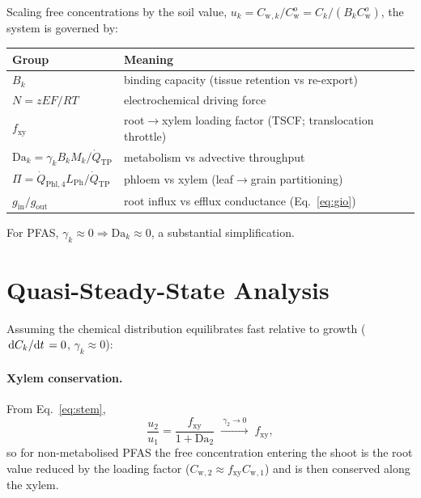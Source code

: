 \documentclass[12pt,a4paper]{article}
\newcommand{\Cw}{C_{\mathrm{w}}}
\begin{document}
Scaling free concentrations by the soil value, $u_k=\Cw{}_{,k}/\Cw^{o}=C_k/(B_k\Cw^{o})$, the system is governed by:
\begin{center}
\renewcommand{\arraystretch}{1.3}
\begin{tabular}{@{}ll@{}}
\toprule
\textbf{Group} & \textbf{Meaning} \\
\midrule
$B_k$ & binding capacity (tissue retention vs re-export) \\
$N=zEF/RT$ & electrochemical driving force \\
$f_\mathrm{xy}$ & root$\to$xylem loading factor (TSCF; translocation throttle) \\
$\mathrm{Da}_k=\gamma_k B_k M_k/\dot Q_\mathrm{TP}$ & metabolism vs advective throughput \\
$\Pi=\dot Q_\mathrm{Phl,4}L_\mathrm{Ph}/\dot Q_\mathrm{TP}$ & phloem vs xylem (leaf$\to$grain partitioning) \\
$g_\mathrm{in}/g_\mathrm{out}$ & root influx vs efflux conductance (Eq.~\ref{eq:gio}) \\
\bottomrule
\end{tabular}
\end{center}
For PFAS, $\gamma_k\approx0\Rightarrow\mathrm{Da}_k\approx0$, a substantial simplification.


\section{Quasi-Steady-State Analysis}\label{sec:qss}

Assuming the chemical distribution equilibrates fast relative to growth ($\dv*{C_k}{t}=0$, $\gamma_k\approx0$):

\paragraph{Xylem conservation.}  From Eq.~\eqref{eq:stem},
\begin{equation}
    \frac{u_2}{u_1}=\frac{f_\mathrm{xy}}{1+\mathrm{Da}_2}\;\xrightarrow{\ \gamma_2\to0\ }\;f_\mathrm{xy},
\end{equation}
so for non-metabolised PFAS the free concentration entering the shoot is the root value reduced by the loading factor ($\Cw{}_{,2}\approx f_\mathrm{xy}\Cw{}_{,1}$) and is then conserved along the xylem.
\end{document}
